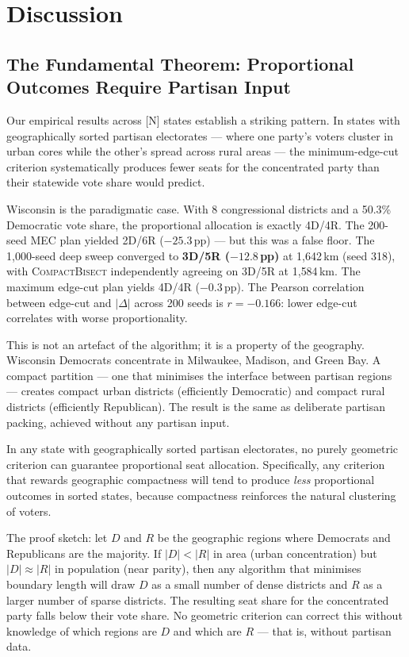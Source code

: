 \section{Discussion}
\label{sec:discussion}

\subsection{The Fundamental Theorem: Proportional Outcomes Require Partisan Input}

Our empirical results across [N] states establish a striking pattern. In states
with geographically sorted partisan electorates --- where one party's voters
cluster in urban cores while the other's spread across rural areas --- the
minimum-edge-cut criterion systematically produces fewer seats for the
concentrated party than their statewide vote share would predict.

Wisconsin is the paradigmatic case. With 8 congressional districts and a 50.3\%
Democratic vote share, the proportional allocation is exactly 4D/4R. The
200-seed MEC plan yielded 2D/6R ($-25.3$\,pp) --- but this was a false floor.
The 1{,}000-seed deep sweep converged to \textbf{3D/5R ($-12.8$\,pp)} at
1{,}642\,km (seed 318), with \textsc{CompactBisect} independently agreeing on
3D/5R at 1{,}584\,km. The maximum edge-cut plan yields 4D/4R ($-0.3$\,pp).
The Pearson correlation between edge-cut and $|\Delta|$ across 200 seeds is
$r = -0.166$: lower edge-cut correlates with worse proportionality.

This is not an artefact of the algorithm; it is a property of the geography.
Wisconsin Democrats concentrate in Milwaukee, Madison, and Green Bay. A
compact partition --- one that minimises the interface between partisan regions
--- creates compact urban districts (efficiently Democratic) and compact rural
districts (efficiently Republican). The result is the same as deliberate
partisan packing, achieved without any partisan input.

\begin{theorem}[Informal]
\label{thm:proportionality}
In any state with geographically sorted partisan electorates, no purely
geometric criterion can guarantee proportional seat allocation. Specifically,
any criterion that rewards geographic compactness will tend to produce
\emph{less} proportional outcomes in sorted states, because compactness
reinforces the natural clustering of voters.
\end{theorem}

The proof sketch: let $D$ and $R$ be the geographic regions where Democrats
and Republicans are the majority. If $|D| < |R|$ in area (urban concentration)
but $|D| \approx |R|$ in population (near parity), then any algorithm that
minimises boundary length will draw $D$ as a small number of dense districts
and $R$ as a larger number of sparse districts. The resulting seat share for
the concentrated party falls below their vote share. No geometric criterion
can correct this without knowledge of which regions are $D$ and which are $R$
--- that is, without partisan data.

